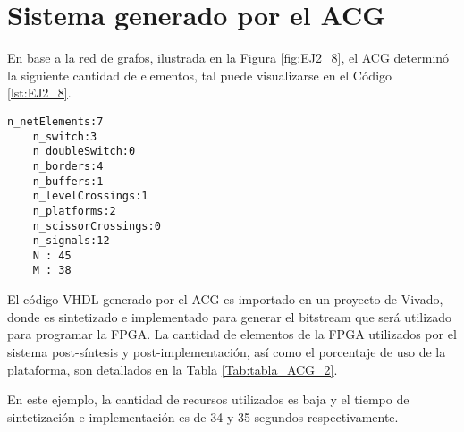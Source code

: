 \section{Sistema generado por el ACG}

	En base a la red de grafos, ilustrada en la Figura \ref{fig:EJ2_8}, el ACG determinó la siguiente cantidad de elementos, tal puede visualizarse en el Código \ref{lst:EJ2_8}.
	
	\begin{lstlisting}[language = {}, caption = Cantidad de elementos a implementar por el ACG, label = {lst:EJ2_8}]
	n_netElements:7
	n_switch:3
	n_doubleSwitch:0
	n_borders:4
	n_buffers:1
	n_levelCrossings:1
	n_platforms:2
	n_scissorCrossings:0
	n_signals:12
	N : 45
	M : 38
	\end{lstlisting}
	
	El código VHDL generado por el ACG es importado en un proyecto de Vivado, donde es sintetizado e implementado para generar el bitstream que será utilizado para programar la FPGA. La cantidad de elementos de la FPGA utilizados por el sistema post-síntesis y post-implementación, así como el porcentaje de uso de la plataforma, son detallados en la Tabla \ref{Tab:tabla_ACG_2}.
	
	\begin{table}[H]
		{
			\caption{Síntesis e implementación del ejemplo 2 generado por el ACG.}
			\label{Tab:tabla_ACG_2}
			\centering
			\begin{center}
			\end{center}
		}    
	\end{table}
	
	En este ejemplo, la cantidad de recursos utilizados es baja y el tiempo de sintetización e implementación es de 34 y 35 segundos respectivamente.